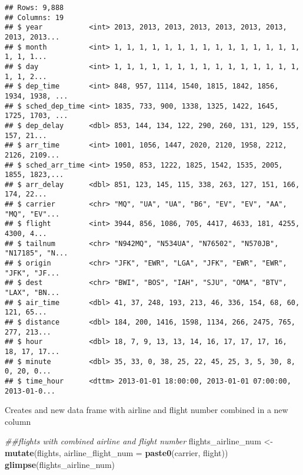 \documentclass[
]{article}
\newenvironment{Shaded}{\begin{snugshade}}{\end{snugshade}}
\newcommand{\CommentTok}[1]{\textcolor[rgb]{0.56,0.35,0.01}{\textit{#1}}}
\newcommand{\DataTypeTok}[1]{\textcolor[rgb]{0.13,0.29,0.53}{#1}}
\newcommand{\KeywordTok}[1]{\textcolor[rgb]{0.13,0.29,0.53}{\textbf{#1}}}
\newcommand{\NormalTok}[1]{#1}
\newcommand{\StringTok}[1]{\textcolor[rgb]{0.31,0.60,0.02}{#1}}
\begin{document}
\begin{verbatim}
## Rows: 9,888
## Columns: 19
## $ year           <int> 2013, 2013, 2013, 2013, 2013, 2013, 2013, 2013, 2013...
## $ month          <int> 1, 1, 1, 1, 1, 1, 1, 1, 1, 1, 1, 1, 1, 1, 1, 1, 1, 1...
## $ day            <int> 1, 1, 1, 1, 1, 1, 1, 1, 1, 1, 1, 1, 1, 1, 1, 1, 1, 2...
## $ dep_time       <int> 848, 957, 1114, 1540, 1815, 1842, 1856, 1934, 1938, ...
## $ sched_dep_time <int> 1835, 733, 900, 1338, 1325, 1422, 1645, 1725, 1703, ...
## $ dep_delay      <dbl> 853, 144, 134, 122, 290, 260, 131, 129, 155, 157, 21...
## $ arr_time       <int> 1001, 1056, 1447, 2020, 2120, 1958, 2212, 2126, 2109...
## $ sched_arr_time <int> 1950, 853, 1222, 1825, 1542, 1535, 2005, 1855, 1823,...
## $ arr_delay      <dbl> 851, 123, 145, 115, 338, 263, 127, 151, 166, 174, 22...
## $ carrier        <chr> "MQ", "UA", "UA", "B6", "EV", "EV", "AA", "MQ", "EV"...
## $ flight         <int> 3944, 856, 1086, 705, 4417, 4633, 181, 4255, 4300, 4...
## $ tailnum        <chr> "N942MQ", "N534UA", "N76502", "N570JB", "N17185", "N...
## $ origin         <chr> "JFK", "EWR", "LGA", "JFK", "EWR", "EWR", "JFK", "JF...
## $ dest           <chr> "BWI", "BOS", "IAH", "SJU", "OMA", "BTV", "LAX", "BN...
## $ air_time       <dbl> 41, 37, 248, 193, 213, 46, 336, 154, 68, 60, 121, 65...
## $ distance       <dbl> 184, 200, 1416, 1598, 1134, 266, 2475, 765, 277, 213...
## $ hour           <dbl> 18, 7, 9, 13, 13, 14, 16, 17, 17, 17, 16, 18, 17, 17...
## $ minute         <dbl> 35, 33, 0, 38, 25, 22, 45, 25, 3, 5, 30, 8, 0, 20, 0...
## $ time_hour      <dttm> 2013-01-01 18:00:00, 2013-01-01 07:00:00, 2013-01-0...
\end{verbatim}

Creates and new data frame with airline and flight number combined in a
new column

\begin{Shaded}
\begin{Highlighting}[]
\CommentTok{##flights with combined airline and flight number}
\NormalTok{flights_airline_num <-}\StringTok{ }\KeywordTok{mutate}\NormalTok{(flights, }\DataTypeTok{airline_flight_num =} \KeywordTok{paste0}\NormalTok{(carrier, flight))}
\KeywordTok{glimpse}\NormalTok{(flights_airline_num)}
\end{Highlighting}
\end{Shaded}
\end{document}

